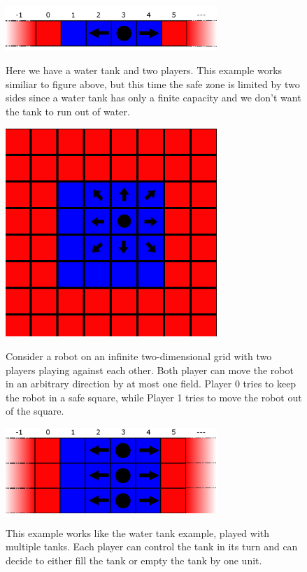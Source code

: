 \documentclass[10pt,a4paper]{article}
\theoremstyle{plain}
\theoremstyle{definition}
\begin{document}
\begin{figure}[h]\label{Wassertank}
  \caption{Here we have a water tank and two players. This example works similiar to figure above, but this time the safe zone is limited by two sides since a water tank has only a finite capacity and we don't want the tank to run out of water.
}
  \centering
    {\includegraphics[width=8.0cm]{wasser_tank.png}} 
\end{figure}

\begin{figure}
  \caption{Consider a robot on an infinite two-dimensional grid with two players playing against each other. Both player can move the robot in an arbitrary direction by at most one field. Player 0 tries to keep the robot in a safe square, while Player 1 tries to move the robot out of the square.
}
  \centering
    {\includegraphics[width=8.0cm]{quadrat.png}} 
\end{figure}


\begin{figure}
  \caption{This example works like the water tank example, played with multiple tanks. Each player can control the tank in its turn and can decide to either fill the tank or empty the tank by one unit.}
  \centering
    {\includegraphics[width=8.0cm]{multi_wasser_tank.png}} 
\end{figure}
\end{document}
